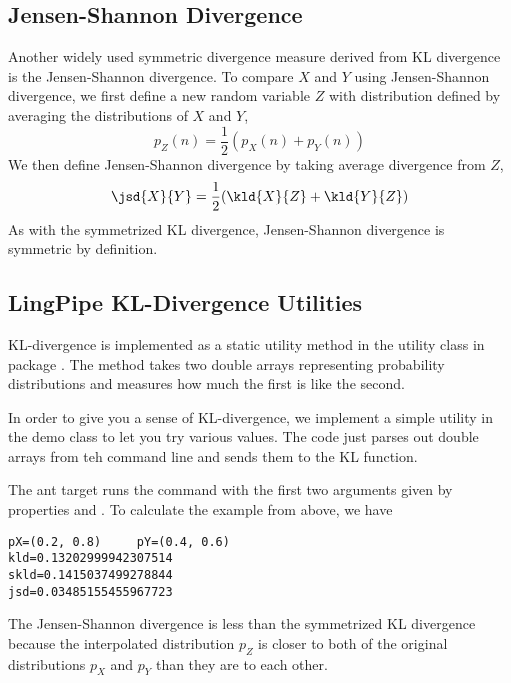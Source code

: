 \subsection{Jensen-Shannon Divergence}

Another widely used symmetric divergence measure derived from KL divergence
is the Jensen-Shannon divergence.  To compare $X$ and $Y$ using Jensen-Shannon
divergence, we first define a new random variable $Z$ with distribution defined by
averaging the distributions of $X$ and $Y$,
%
\[
p_Z(n) = \frac{1}{2}(p_X(n) + p_Y(n))
\]
%
We then define Jensen-Shannon divergence by taking average divergence
from $Z$,
%
\begin{equation}
\jsd{X}{Y} = \frac{1}{2}(\kld{X}{Z} + \kld{Y}{Z})
\end{equation}
%
As with the symmetrized KL divergence, Jensen-Shannon divergence is
symmetric by definition.


\subsection{LingPipe KL-Divergence Utilities}

KL-divergence is implemented as a static utility method in the
 utility class in package .
The method takes two double arrays representing probability
distributions and measures how much the first is like the second.

In order to give you a sense of KL-divergence, we implement a simple
utility in the demo class  to let you try various
values.  The code just parses out double arrays from teh command line
and sends them to the KL function.
%

The ant target  runs the command with the first two arguments
given by properties  and .  To calculate the example
from above, we have
%
\begin{verbatim}
pX=(0.2, 0.8)     pY=(0.4, 0.6)     
kld=0.13202999942307514    
skld=0.1415037499278844   
jsd=0.03485155455967723
\end{verbatim}
%
The Jensen-Shannon divergence is less than the symmetrized KL
divergence because the interpolated distribution $p_Z$ is closer to
both of the original distributions $p_X$ and $p_Y$ than they are to
each other.

